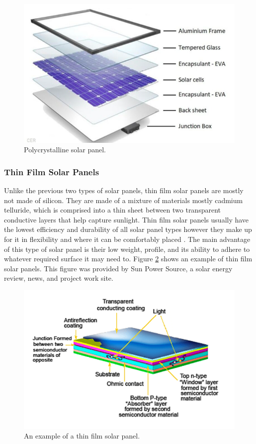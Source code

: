 \begin{figure}
    \centering
    \includegraphics[scale=0.4]{figures/polycrystaline solar.png}
    \caption{Polycrystalline solar panel.}
    \label{fig:poly-sp} 
\end{figure}

\subsubsection{Thin Film Solar Panels}
Unlike the previous two types of solar panels, thin film solar panels are mostly not made of silicon. They are made of a mixture of materials mostly cadmium telluride, which is comprised into a thin sheet between two transparent conductive layers that help capture sunlight. Thin film solar panels usually have the lowest efficiency and durability of all solar panel types however they make up for it in flexibility and where it can be comfortably placed . The main advantage of this type of solar panel is their low weight, profile, and its ability to adhere to whatever required surface it may need to. Figure \ref{fig:thin-film-sp} shows an example of thin film solar panels. This figure was provided by Sun Power Source, a solar energy review, news, and project work site.

\begin{figure}
    \centering
    \includegraphics[scale=0.4]{figures/thin film solar.png}
    \caption{An example of a thin film solar panel.}
    \label{fig:thin-film-sp} 
\end{figure}


